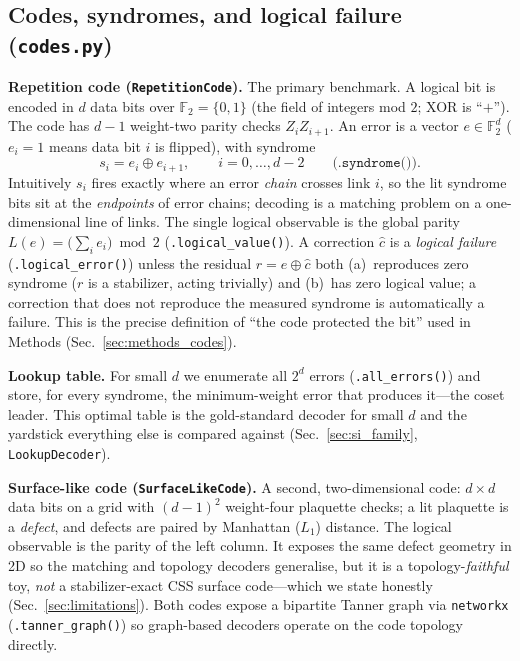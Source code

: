\documentclass[reprint,aps,prxquantum,amsmath,amssymb,floatfix,nofootinbib,longbibliography]{revtex4-2}
\theoremstyle{definition}
\theoremstyle{remark}
\theoremstyle{plain}
\newcommand{\F}{\mathbb{F}}
\begin{document}
\subsection{Codes, syndromes, and logical failure (\texttt{codes.py})}
\label{sec:si_codes}
\textbf{Repetition code (\texttt{RepetitionCode}).} The primary benchmark. A logical bit is encoded in $d$ data bits over $\F_2=\{0,1\}$ (the field of integers mod $2$; XOR is ``$+$''). The code has $d-1$ weight-two parity checks $Z_iZ_{i+1}$. An error is a vector $e\in\F_2^d$ ($e_i=1$ means data bit $i$ is flipped), with syndrome
\begin{equation}
  s_i = e_i \oplus e_{i+1}, \qquad i = 0,\dots,d-2 \qquad \texttt{(.syndrome())}.
\end{equation}
Intuitively $s_i$ fires exactly where an error \emph{chain} crosses link $i$, so the lit syndrome bits sit at the \emph{endpoints} of error chains; decoding is a matching problem on a one-dimensional line of links. The single logical observable is the global parity $L(e)=\bigl(\sum_i e_i\bigr)\bmod 2$ (\texttt{.logical\_value()}). A correction $\hat c$ is a \emph{logical failure} (\texttt{.logical\_error()}) unless the residual $r=e\oplus\hat c$ both (a)~reproduces zero syndrome ($r$ is a stabilizer, acting trivially) and (b)~has zero logical value; a correction that does not reproduce the measured syndrome is automatically a failure. This is the precise definition of ``the code protected the bit'' used in Methods (Sec.~\ref{sec:methods_codes}).

\textbf{Lookup table.} For small $d$ we enumerate all $2^d$ errors (\texttt{.all\_errors()}) and store, for every syndrome, the minimum-weight error that produces it---the coset leader. This optimal table is the gold-standard decoder for small $d$ and the yardstick everything else is compared against (Sec.~\ref{sec:si_family}, \texttt{LookupDecoder}).

\textbf{Surface-like code (\texttt{SurfaceLikeCode}).} A second, two-dimensional code: $d\times d$ data bits on a grid with $(d-1)^2$ weight-four plaquette checks; a lit plaquette is a \emph{defect}, and defects are paired by Manhattan ($L_1$) distance. The logical observable is the parity of the left column. It exposes the same defect geometry in 2D so the matching and topology decoders generalise, but it is a topology-\emph{faithful} toy, \emph{not} a stabilizer-exact CSS surface code---which we state honestly (Sec.~\ref{sec:limitations}). Both codes expose a bipartite Tanner graph via \texttt{networkx} (\texttt{.tanner\_graph()}) so graph-based decoders operate on the code topology directly.
\end{document}

